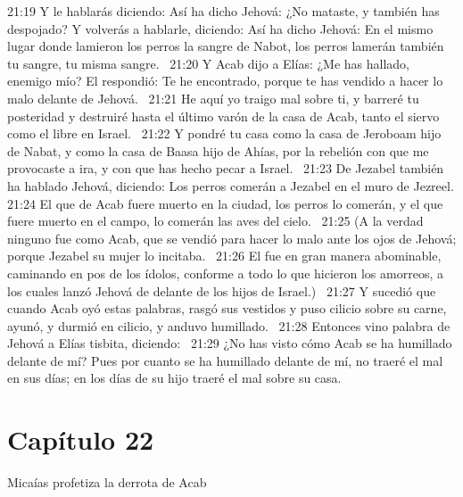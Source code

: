 21:19 Y le hablarás diciendo: Así ha dicho Jehová: ¿No mataste, y también has despojado? Y volverás a hablarle, diciendo: Así ha dicho Jehová: En el mismo lugar donde lamieron los perros la sangre de Nabot, los perros lamerán también tu sangre, tu misma sangre.  
21:20 Y Acab dijo a Elías: ¿Me has hallado, enemigo mío? El respondió: Te he encontrado, porque te has vendido a hacer lo malo delante de Jehová.  
21:21 He aquí yo traigo mal sobre ti, y barreré tu posteridad y destruiré hasta el último varón de la casa de Acab, tanto el siervo como el libre en Israel.  
21:22 Y pondré tu casa como la casa de Jeroboam hijo de Nabat, y como la casa de Baasa hijo de Ahías, por la rebelión con que me provocaste a ira, y con que has hecho pecar a Israel.  
21:23 De Jezabel también ha hablado Jehová, diciendo: Los perros comerán a Jezabel en el muro de Jezreel. 
21:24 El que de Acab fuere muerto en la ciudad, los perros lo comerán, y el que fuere muerto en el campo, lo comerán las aves del cielo.  
21:25 (A la verdad ninguno fue como Acab, que se vendió para hacer lo malo ante los ojos de Jehová; porque Jezabel su mujer lo incitaba.  
21:26 El fue en gran manera abominable, caminando en pos de los ídolos, conforme a todo lo que hicieron los amorreos, a los cuales lanzó Jehová de delante de los hijos de Israel.)  
21:27 Y sucedió que cuando Acab oyó estas palabras, rasgó sus vestidos y puso cilicio sobre su carne, ayunó, y durmió en cilicio, y anduvo humillado.  
21:28 Entonces vino palabra de Jehová a Elías tisbita, diciendo:  
21:29 ¿No has visto cómo Acab se ha humillado delante de mí? Pues por cuanto se ha humillado delante de mí, no traeré el mal en sus días; en los días de su hijo traeré el mal sobre su casa.  
\section*{Capítulo 22 }
Micaías profetiza la derrota de Acab  


